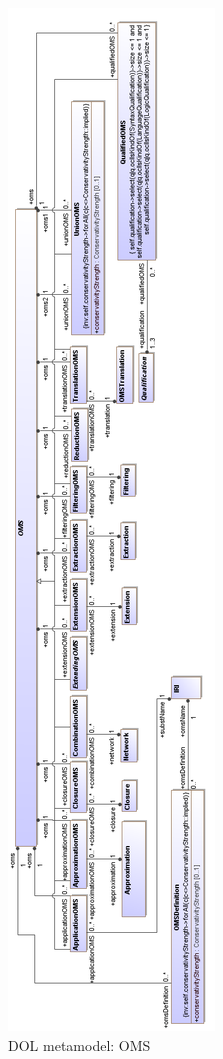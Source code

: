 \documentclass[10pt, a4paper]{isov2}
\begin{document}
\begin{figure}
  \centering

    \includegraphics[scale=0.43]{mof/oms.png}
  \caption{DOL metamodel: OMS}
  \label{fig:oms}

\end{figure}
\end{document}
